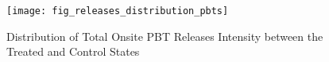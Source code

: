 \begin{figure}[H]
    \centering
    \texttt{[image: fig\_releases\_distribution\_pbts]}
    \caption{Distribution of Total Onsite PBT Releases Intensity between the Treated and Control States}
    \label{fig:releases-distribution-pbts}
\end{figure}